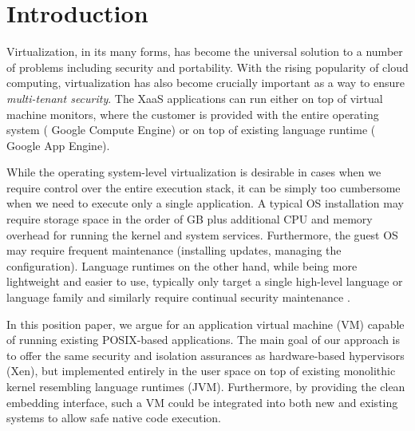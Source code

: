 \section{Introduction}
\label{sec:intro}



Virtualization, in its many forms, has become the universal solution to
a number of problems including security and portability.  With the
rising popularity of cloud computing, virtualization has also become
crucially important as a way to ensure \emph{multi-tenant security}. The
XaaS applications can run either on top of virtual machine monitors,
where the customer is provided with the entire operating system (\eg
Google Compute Engine) or on top of existing language runtime (\eg
Google App Engine).

While the operating system-level virtualization is desirable in cases
when we require control over the entire execution stack, it can be
simply too cumbersome when we need to execute only a single
application.  A typical OS installation may require storage space in
the order of GB plus additional CPU and memory overhead for running
the kernel and system services. Furthermore, the guest OS may require
frequent maintenance (\eg installing updates, managing the
configuration).  Language runtimes on the other hand, while being more
lightweight and easier to use, typically only target a single
high-level language or language family and similarly require continual
security maintenance \cite{java0day2013}.

In this position paper, we argue for an application virtual machine (VM)
capable of running existing POSIX-based applications. The main goal of
our approach is to offer the same security and isolation assurances as
hardware-based hypervisors (\eg Xen), but implemented entirely in the
user space on top of existing monolithic kernel resembling language
runtimes (\eg JVM). Furthermore, by providing the clean embedding
interface, such a VM could be integrated into both new and existing
systems to allow safe native code execution.


